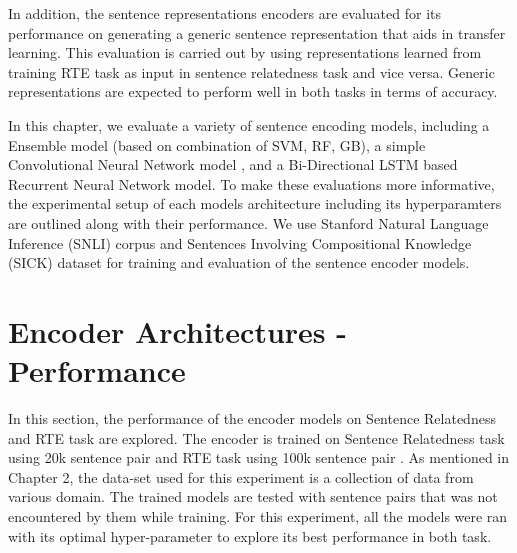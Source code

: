 \documentclass[12pt]{report} %
\begin{document}
 In addition, the sentence representations encoders are evaluated for its performance on generating a generic sentence representation that aids in transfer learning. This evaluation is carried out by using representations learned from training RTE task as input in sentence relatedness task and vice versa. Generic representations are expected to perform well in both tasks in terms of accuracy.  
 
 In this chapter, we evaluate a variety of sentence encoding models,
 including a Ensemble model (based on combination of SVM, RF, GB), a simple Convolutional Neural Network model , and a Bi-Directional LSTM based Recurrent Neural Network model. To make these evaluations more informative, the experimental setup of each models architecture including its hyperparamters are outlined along with their performance. We use Stanford Natural Language Inference (SNLI) corpus and Sentences Involving Compositional Knowledge (SICK) dataset for training and evaluation of the sentence encoder models. 
 
 
 


\section{Encoder Architectures - Performance}
In this section, the performance of the encoder models on Sentence Relatedness and RTE task are explored. The encoder is trained on Sentence Relatedness task using 20k sentence pair \cite{cer2017semeval} and RTE task using 100k sentence pair \cite{bowman2015large}. As mentioned in Chapter 2, the data-set used for this experiment is a collection of data from various domain. The trained models are tested with sentence pairs that was not encountered by them while training. For this experiment, all the models were ran with its optimal hyper-parameter to explore  its best performance in both task.
\end{document}
